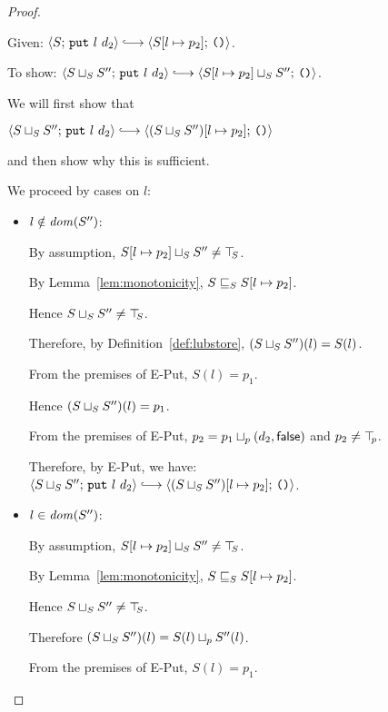 \begin{proof}
\begin{itemize}
      Given: $\config{S}{\putexp{l}{d_2}} \parstepsto
      \config{\extSRaw{S}{l}{p_2}}{\unit}$.

      To show: $\config{\lubstore{S}{S''}}{\putexp{l}{d_2}}
      \parstepsto
      \config{\lubstore{\extSRaw{S}{l}{p_2}}{S''}}{\unit}$.

      We will first show that

      $\config{\lubstore{S}{S''}}{\putexp{l}{d_2}} \parstepsto
      \config{\extSRaw{(\lubstore{S}{S''})}{l}{p_2}}{\unit}$

      and then show why this is sufficient.

      We proceed by cases on $l$:

      \begin{itemize}
        \item $l \notin \mathit{dom}(S'')$:

          By assumption, $S[l \mapsto p_2] \sqcup_{S} S'' \neq
          \top\hspace{-0.85mm}_{S}$.

          By Lemma~\ref{lem:monotonicity}, $S \sqsubseteq_S S[l \mapsto p_2]$.

          Hence $S \sqcup_{S} S'' \neq \top\hspace{-0.85mm}_{S}$.

          Therefore, by Definition~\ref{def:lubstore},
          $(S \sqcup_{S} S'')(l) = S(l)$.

          From the premises of {\sc E-Put}, $S(l) = p_1$.

          Hence $(S \sqcup_{S} S'')(l) = p_1$.

          From the premises of {\sc E-Put}, $p_2 =
          p_1 \sqcup_p (d_2, \textsf{false})$ and $p_2 \neq \top\hspace{-0.85mm}_{p}$.

          Therefore, by {\sc E-Put}, we have:
          $\config{\lubstore{S}{S''}}{\putexp{l}{d_2}} \parstepsto
          \config{\extSRaw{(\lubstore{S}{S''})}{l}{p_2}}{\unit}$.

        \item $l \in \mathit{dom}(S'')$:

          By assumption, $S[l \mapsto p_2] \sqcup_{S} S'' \neq
          \top\hspace{-0.85mm}_{S}$.

          By Lemma~\ref{lem:monotonicity}, $S \sqsubseteq_S S[l \mapsto p_2]$.

          Hence $S \sqcup_{S} S'' \neq \top\hspace{-0.85mm}_{S}$.

          Therefore $(S \sqcup_{S} S'')(l) = S(l) \sqcup_p S''(l)$.

          From the premises of {\sc E-Put}, $S(l) = p_1$.
          

\end{itemize}
\end{itemize}
\end{proof}

